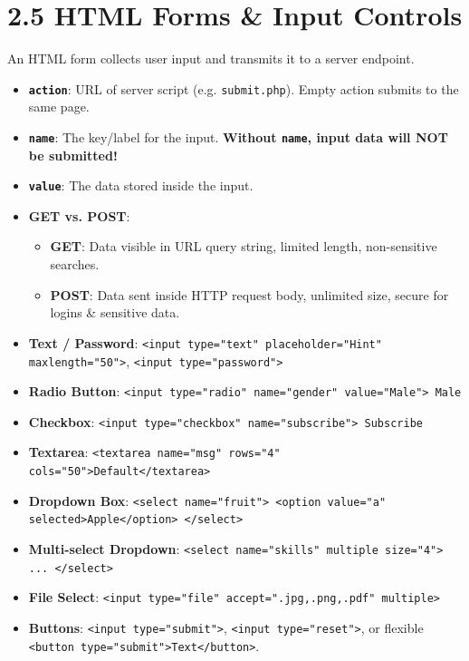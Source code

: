 \section{2.5 HTML Forms \& Input Controls}
An HTML form collects user input and transmits it to a server endpoint.

\begin{summarybox}
\begin{itemize}[leftmargin=*]
    \item \textbf{\texttt{action}}: URL of server script (e.g. \texttt{submit.php}). Empty action submits to the same page.
    \item \textbf{\texttt{name}}: The key/label for the input. \textbf{Without \texttt{name}, input data will NOT be submitted!}
    \item \textbf{\texttt{value}}: The data stored inside the input.
    \item \textbf{GET vs. POST}:
    \begin{itemize}
        \item \textbf{GET}: Data visible in URL query string, limited length, non-sensitive searches.
        \item \textbf{POST}: Data sent inside HTTP request body, unlimited size, secure for logins \& sensitive data.
    \end{itemize}
\end{itemize}
\end{summarybox}

\begin{notebox}
\begin{itemize}[leftmargin=*]
    \item \textbf{Text / Password}: \texttt{<input type="text" placeholder="Hint" maxlength="50">}, \texttt{<input type="password">}
    \item \textbf{Radio Button}: \texttt{<input type="radio" name="gender" value="Male"> Male}
    \item \textbf{Checkbox}: \texttt{<input type="checkbox" name="subscribe"> Subscribe}
    \item \textbf{Textarea}: \texttt{<textarea name="msg" rows="4" cols="50">Default</textarea>}
    \item \textbf{Dropdown Box}: \texttt{<select name="fruit"> <option value="a" selected>Apple</option> </select>}
    \item \textbf{Multi-select Dropdown}: \texttt{<select name="skills" multiple size="4"> ... </select>}
    \item \textbf{File Select}: \texttt{<input type="file" accept=".jpg,.png,.pdf" multiple>}
    \item \textbf{Buttons}: \texttt{<input type="submit">}, \texttt{<input type="reset">}, or flexible \texttt{<button type="submit">Text</button>}.
\end{itemize}
\end{notebox}
